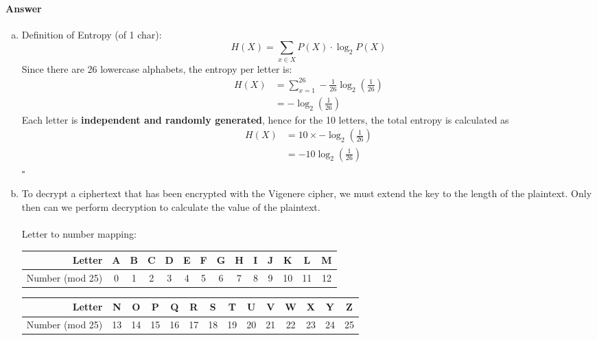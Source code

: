 \documentclass[12pt]{article}
\newcommand{\EOQ}{\hfill $\square$}
\begin{document}
\paragraph{Answer}
\begin{enumerate}[(a)]
\item Definition of Entropy (of 1 char):
\begin{equation*}
H(X)=\sum_{x\in X}P(X)\cdot \log_2 P(X)
\end{equation*}
Since there are 26 lowercase alphabets, the entropy per letter is:
\begin{equation*}
\begin{split}
H(X)&=\sum_{x=1}^{26}-\frac{1}{26}\log_2(\frac{1}{26})\\
&=-\log_2(\frac{1}{26})
\end{split}
\end{equation*}
Each letter is \textbf{independent and randomly generated}, hence for the 10 letters, the total entropy is calculated as
\begin{equation*}
\begin{split}
H(X)&=10\times-\log_2(\frac{1}{26})\\&=-10\log_2(\frac{1}{26})
\end{split}
\end{equation*}
\EOQ
\item To decrypt a ciphertext that has been encrypted with the Vigenere cipher, we must extend the key to the length of the plaintext. Only then can we perform decryption to calculate the value of the plaintext.\\\\Letter to number mapping:
\begin{table}[H]
\begin{tabular}{r|ccccccccccccc}
Letter                          & A & B & C & D & E & F & G & H & I & J & K  & L  & M  \\ \hline
Number (mod 25) & 0 & 1 & 2 & 3 & 4 & 5 & 6 & 7 & 8 & 9 & 10 & 11 & 12
\end{tabular}
\end{table}
\begin{table}[H]
\begin{tabular}{r|ccccccccccccc}
Letter                          & N  & O  & P  & Q  & R  & S  & T  & U  & V  & W  & X  & Y  & Z  \\ \hline
Number (mod 25) & 13 & 14 & 15 & 16 & 17 & 18 & 19 & 20 & 21 & 22 & 23 & 24 & 25
\end{tabular}
\end{table}

\end{enumerate}
\end{document}

